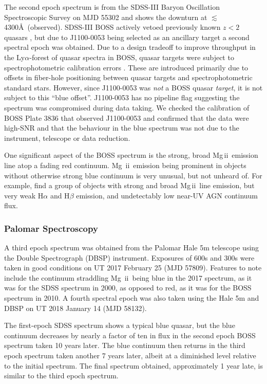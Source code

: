 \documentclass[a4paper,fleqn,usenatbib]{mnras}
\begin{document}
The second epoch spectrum is from the SDSS-III Baryon Oscillation
Spectroscopic Survey \citep[BOSS; ][]{Dawson2013} on MJD 55302 and
shows the downturn at $\lesssim$4300\AA\ (observed). SDSS-III BOSS
actively vetoed previously known $z<2$ quasars \citep{Ross2012}, but
due to J1100-0053 being selected as an ancillary target \citep[via a
white dwarf program;][]{Kepler2015, Kepler2016} a second spectral
epoch was obtained. Due to a design tradeoff to improve throughput in
the Ly$\alpha$-forest of quasar spectra in BOSS, quasar targets were
subject to spectrophotometric calibration errors
\citep{Margala2016}. These are introduced primarily due to offsets in
fiber-hole positioning between quasar targets and spectrophotometric
standard stars. However, since J1100-0053 was {\it not} a BOSS quasar
{\it target}, it is not subject to this ``blue offset''. J1100-0053
has no pipeline flag suggesting the spectrum was compromised during
data taking. We checked the calibration of BOSS Plate 3836 that
observed J1100-0053 and confirmed that the data were high-SNR and that
the behaviour in the blue spectrum was not due to the instrument,
telescope or data reduction.

One significant aspect of the BOSS spectrum is the strong, broad
Mg\,{\sc ii}\ emission line atop a fading red continuum.  Mg\,{\sc
ii}\ emission being prominent in objects without otherwise strong blue
continuum is very unusual, but not unheard of.  For example,
\citet{Roig2014} find a group of objects with strong and broad
Mg\,{\sc ii}\ line emission, but very weak H$\alpha$ and H$\beta$
emission, and undetectably low near-UV AGN continuum flux.


\subsubsection{Palomar Spectroscopy} 
A third epoch spectrum was obtained from the Palomar Hale 5m telescope
using the Double Spectrograph (DBSP) instrument.  Exposures of 600s
and 300s were taken in good conditions on UT 2017 February 25 (MJD
57809). Features to note include the continuum straddling Mg\,{\sc
ii}\ being blue in the 2017 spectrum, as it was for the SDSS spectrum
in 2000, as opposed to red, as it was for the BOSS spectrum in 2010. A
fourth spectral epoch was also taken using the Hale 5m and DBSP on
UT 2018 January 14 (MJD 58132). 

The first-epoch SDSS spectrum shows a typical blue quasar, but the
blue continuum decreases by nearly a factor of ten in flux in the
second epoch BOSS spectrum taken 10 years later. The blue continuum
then returns in the third epoch spectrum taken another 7 years later,
albeit at a diminished level relative to the initial spectrum. The
final spectrum obtained, approximately 1 year late, is similar to the
third epoch spectrum.
\end{document}
